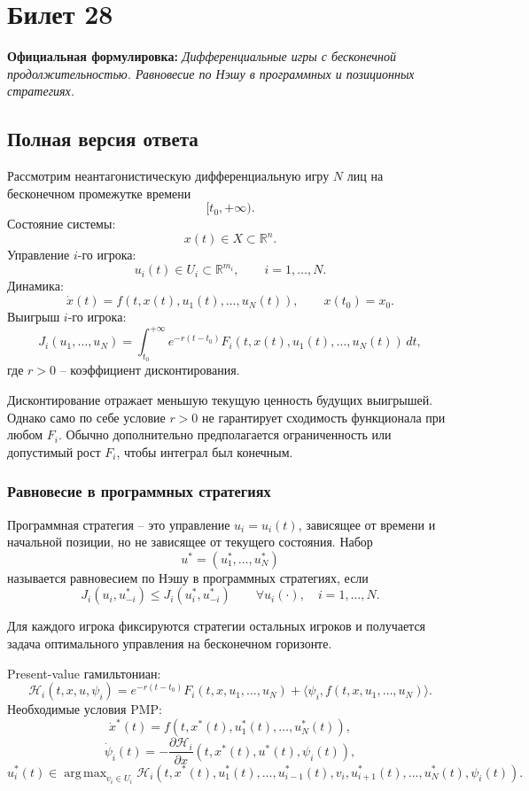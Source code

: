 \documentclass[12pt,a4paper]{article}
\newcommand{\R}{\mathbb{R}}
\DeclareMathOperator*{\argmax}{arg\,max}
\begin{document}
\newpage
\section{Билет 28}

\textbf{Официальная формулировка:} \emph{Дифференциальные игры с бесконечной продолжительностью. Равновесие по Нэшу в программных и позиционных стратегиях.}

\subsection{Полная версия ответа}

Рассмотрим неантагонистическую дифференциальную игру $N$ лиц на бесконечном промежутке времени
\[
 [t_0,+\infty).
\]
Состояние системы:
\[
 x(t)\in X\subset\R^n.
\]
Управление $i$-го игрока:
\[
 u_i(t)\in U_i\subset\R^{m_i},\qquad i=1,\ldots,N.
\]
Динамика:
\[
 \dot x(t)=f(t,x(t),u_1(t),\ldots,u_N(t)),\qquad x(t_0)=x_0.
\]
Выигрыш $i$-го игрока:
\[
 J_i(u_1,\ldots,u_N)=\int_{t_0}^{+\infty}e^{-r(t-t_0)}F_i(t,x(t),u_1(t),\ldots,u_N(t))\,dt,
\]
где $r>0$ -- коэффициент дисконтирования.

Дисконтирование отражает меньшую текущую ценность будущих выигрышей. Однако само по себе условие $r>0$ не гарантирует сходимость функционала при любом $F_i$. Обычно дополнительно предполагается ограниченность или допустимый рост $F_i$, чтобы интеграл был конечным.

\subsubsection{Равновесие в программных стратегиях}

Программная стратегия -- это управление $u_i=u_i(t)$, зависящее от времени и начальной позиции, но не зависящее от текущего состояния. Набор
\[
 u^*=(u_1^*,\ldots,u_N^*)
\]
называется равновесием по Нэшу в программных стратегиях, если
\[
 J_i(u_i,u_{-i}^*)\le J_i(u_i^*,u_{-i}^*)\qquad \forall u_i(\cdot),\quad i=1,\ldots,N.
\]

Для каждого игрока фиксируются стратегии остальных игроков и получается задача оптимального управления на бесконечном горизонте.

Present-value гамильтониан:
\[
 \mathcal H_i(t,x,u,\psi_i)=e^{-r(t-t_0)}F_i(t,x,u_1,\ldots,u_N)+\langle\psi_i,f(t,x,u_1,\ldots,u_N)\rangle.
\]
Необходимые условия PMP:
\[
 \dot x^*(t)=f(t,x^*(t),u_1^*(t),\ldots,u_N^*(t)),
\]
\[
 \dot\psi_i(t)=-\frac{\partial\mathcal H_i}{\partial x}(t,x^*(t),u^*(t),\psi_i(t)),
\]
\[
 u_i^*(t)\in\argmax_{v_i\in U_i}\mathcal H_i(t,x^*(t),u_1^*(t),\ldots,u_{i-1}^*(t),v_i,u_{i+1}^*(t),\ldots,u_N^*(t),\psi_i(t)).
\]
\end{document}
